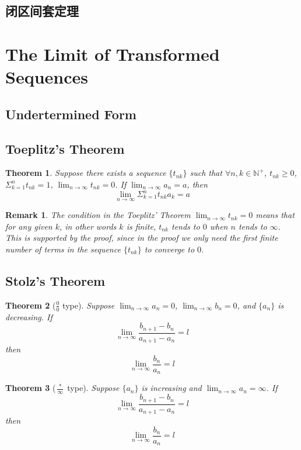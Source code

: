 \documentclass[onecolumn]{ctexart}
\newtheorem{theorem}{Theorem}
\newtheorem{remark}{Remark}
\begin{document}
\subsection{闭区间套定理}

\section{The Limit of Transformed Sequences}

\subsection{Undertermined Form}

\subsection{Toeplitz's Theorem}

\begin{theorem}
  Suppose there exists a sequence $\{t_{nk}\}$ such that 
  $\forall n, k \in \mathbb{N^+}$, $t_{nk} \geq 0$, $\Sigma_{k=1}^n t_{nk} = 1$, 
  $\lim_{n \to \infty} t_{nk} = 0$. If $\lim_{n \to \infty} a_n = a$, then 
  \[
    \lim_{n \to \infty} \Sigma_{k=1}^n t_{nk} a_k = a
  \]
\end{theorem}

\begin{remark}
  The condition in the Toeplitz' Theorem $\lim_{n \to \infty} t_{nk} = 0$ means 
  that for any given $k$, in other words $k$ is finite, $t_{nk}$ tends to $0$ 
  when $n$ tends to $\infty$. This is supported by the proof, since in the proof 
  we only need the first finite number of terms in the sequence $\{t_{nk}\}$ to 
  converge to $0$.
\end{remark}

\subsection{Stolz's Theorem}

\begin{theorem}[$\frac{0}{0}$ type]
  Suppose $\lim_{n \to \infty} a_n = 0$, $\lim_{n \to \infty} b_n = 0$, and 
  $\{a_n\}$ is decreasing. If 
  \[
    \lim_{n \to \infty} \frac{b_{n+1} - b_n}{a_{n+1} - a_n} = l
  \]
  then 
  \[
    \lim_{n \to \infty} \frac{b_n}{a_n} = l
  \]
\end{theorem}

\begin{theorem}[$\frac{*}{\infty}$ type]
  Suppose $\{a_n\}$ is increasing and $\lim_{n \to \infty} a_n = \infty$. If
  \[
    \lim_{n \to \infty} \frac{b_{n+1} - b_n}{a_{n+1} - a_n} = l
  \]
  then
  \[
    \lim_{n \to \infty} \frac{b_n}{a_n} = l   
  \]
\end{theorem}
\end{document}
